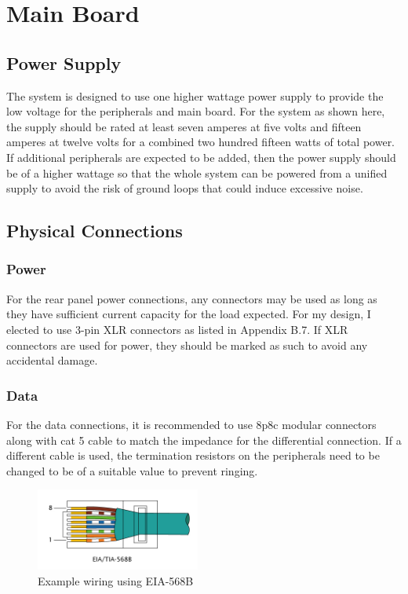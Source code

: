 \documentclass{book}
\begin{document}
\chapter{Main Board}
\section{Power Supply}
The system is designed to use one higher wattage power supply to provide the low voltage for the peripherals and main board. For the system as shown here, the supply should be rated at least seven amperes at five volts and fifteen amperes at twelve volts for a combined two hundred fifteen watts of total power. If additional peripherals are expected to be added, then the power supply should be of a higher wattage so that the whole system can be powered from a unified supply to avoid the risk of ground loops that could induce excessive noise.

\section{Physical Connections}
\subsection{Power}
For the rear panel power connections, any connectors may be used as long as they have sufficient current capacity for the load expected. For my design, I elected to use 3-pin XLR connectors as listed in Appendix B.7. If XLR connectors are used for power, they should be marked as such to avoid any accidental damage.

\subsection{Data}
For the data connections, it is recommended to use 8p8c modular connectors along with cat 5 cable to match the impedance for the differential connection. If a different cable is used, the termination resistors on the peripherals need to be changed to be of a suitable value to prevent ringing.

\begin{figure}
  \begin{center}
    \includegraphics[width=0.48\textwidth]{RJ-45_TIA-568B_Left.png}
  \end{center}
  \caption[Example wiring using EIA-568B]{Example wiring using EIA-568B\cite{img:eia568}\label{fig:eia568}}
\end{figure}
\end{document}
